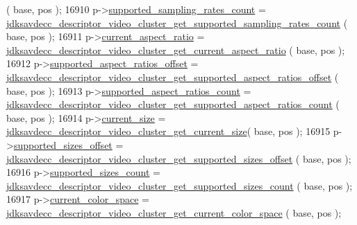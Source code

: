 \begin{DoxyCode}
      ( base, pos );
16910         p->\hyperlink{structjdksavdecc__descriptor__video__unit__cluster_a976ed67e20174bbc1a9988dc8f577fd8}{supported\_sampling\_rates\_count} = 
      \hyperlink{group__descriptor__video__cluster_gaa8843af85f40ba23ee412639f13e9dc4}{jdksavdecc\_descriptor\_video\_cluster\_get\_supported\_sampling\_rates\_count}
      ( base, pos );
16911         p->\hyperlink{structjdksavdecc__descriptor__video__unit__cluster_a37e093dd240216552aa87a2d2feaa310}{current\_aspect\_ratio} = 
      \hyperlink{group__descriptor__video__cluster_ga0143cf82227db8f2fdc66a0304c589e1}{jdksavdecc\_descriptor\_video\_cluster\_get\_current\_aspect\_ratio}
      ( base, pos );
16912         p->\hyperlink{structjdksavdecc__descriptor__video__unit__cluster_a87bb2020a649eb68ce41e714a2d7d838}{supported\_aspect\_ratios\_offset} = 
      \hyperlink{group__descriptor__video__cluster_gace8d09c29a26d8761083fdd5be04bed0}{jdksavdecc\_descriptor\_video\_cluster\_get\_supported\_aspect\_ratios\_offset}
      ( base, pos );
16913         p->\hyperlink{structjdksavdecc__descriptor__video__unit__cluster_abe30723a49848d56d0fbca98a1e02ab6}{supported\_aspect\_ratios\_count} = 
      \hyperlink{group__descriptor__video__cluster_ga0e70f6f4772f4b5aa21781c0d5e18bdb}{jdksavdecc\_descriptor\_video\_cluster\_get\_supported\_aspect\_ratios\_count}
      ( base, pos );
16914         p->\hyperlink{structjdksavdecc__descriptor__video__unit__cluster_a8444502ec86f883b4c80ebd5b8218b07}{current\_size} = 
      \hyperlink{group__descriptor__video__cluster_gaaa012c6f59ad9fe252e99f8865df458e}{jdksavdecc\_descriptor\_video\_cluster\_get\_current\_size}( 
      base, pos );
16915         p->\hyperlink{structjdksavdecc__descriptor__video__unit__cluster_a4de5ca1afb8f583facff9d78d61b98c6}{supported\_sizes\_offset} = 
      \hyperlink{group__descriptor__video__cluster_ga54b5236c4ec197fff81a95ce9cc36e54}{jdksavdecc\_descriptor\_video\_cluster\_get\_supported\_sizes\_offset}
      ( base, pos );
16916         p->\hyperlink{structjdksavdecc__descriptor__video__unit__cluster_a46e215a11ac96892c1e6a2d520e901c0}{supported\_sizes\_count} = 
      \hyperlink{group__descriptor__video__cluster_gab1dc5001ee29fc2f73280c976f20aa82}{jdksavdecc\_descriptor\_video\_cluster\_get\_supported\_sizes\_count}
      ( base, pos );
16917         p->\hyperlink{structjdksavdecc__descriptor__video__unit__cluster_a135455c45a6c2e37e96118ff6f374d9b}{current\_color\_space} = 
      \hyperlink{group__descriptor__video__cluster_gaaf69fa8d4ff79a1f3f7ff125d840a4cb}{jdksavdecc\_descriptor\_video\_cluster\_get\_current\_color\_space}
      ( base, pos );

\end{DoxyCode}
